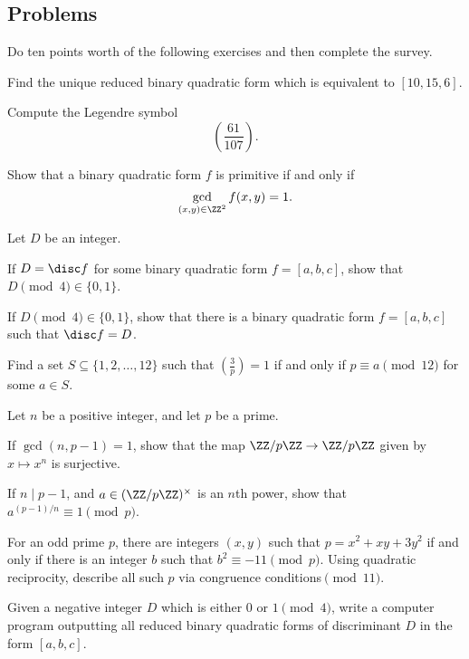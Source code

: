 \documentclass[../notes.tex]{subfiles}
\begin{document}
\subsection{Problems}
Do ten points worth of the following exercises and then complete the survey.
\begin{prob}[1 point]
	Find the unique reduced binary quadratic form which is equivalent to $[10,15,6]$.
\end{prob}
\begin{prob}[1 point]
	Compute the Legendre symbol
	\[\left(\frac{61}{107}\right).\]
\end{prob}
\begin{prob}[2 points] \label{prob:more-intinsic-primitive}
	Show that a binary quadratic form $f$ is primitive if and only if
	\[\gcd_{(x,y)\in\ZZ^2}f(x,y)=1.\]
\end{prob}
\begin{prob}[2 points]
	Let $D$ be an integer.
	\begin{listalph}
		\item If $D=\disc f$ for some binary quadratic form $f=[a,b,c]$, show that $D\pmod4\in\{0,1\}$.
		\item If $D\pmod4\in\{0,1\}$, show that there is a binary quadratic form $f=[a,b,c]$ such that $\disc f=D$.
	\end{listalph}
\end{prob}
\begin{prob}[2 points]
	Find a set $S\subseteq\{1,2,\ldots,12\}$ such that $\left(\frac3p\right)=1$ if and only if $p\equiv a\pmod{12}$ for some $a\in S$.
\end{prob}
\begin{prob}[3 points]
	Let $n$ be a positive integer, and let $p$ be a prime.
	\begin{listalph}
		\item If $\gcd(n,p-1)=1$, show that the map $\ZZ/p\ZZ\to\ZZ/p\ZZ$ given by $x\mapsto x^n$ is surjective.
		\item If $n\mid p-1$, and $a\in(\ZZ/p\ZZ)^\times$ is an $n$th power, show that $a^{(p-1)/n}\equiv1\pmod p$.
	\end{listalph}
\end{prob}
\begin{prob}[5 points]
	For an odd prime $p$, there are integers $(x,y)$ such that $p=x^2+xy+3y^2$ if and only if there is an integer $b$ such that $b^2\equiv-11\pmod p$. Using quadratic reciprocity, describe all such $p$ via congruence conditions$\pmod{11}$.
\end{prob}
\begin{prob}[5 points]
	Given a negative integer $D$ which is either $0$ or $1\pmod4$, write a computer program outputting all reduced binary quadratic forms of discriminant $D$ in the form $[a,b,c]$.
\end{prob}
\end{document}
